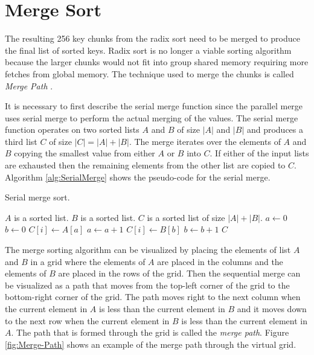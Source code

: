 \section{Merge Sort}

The resulting 256 key chunks from the radix sort need to be merged to produce the final list of sorted keys. Radix sort is no longer a viable sorting algorithm because the larger chunks would not fit into group shared memory requiring more fetches from global memory. The technique used to merge the chunks is called \emph{Merge Path} \parencite{33_green_mccoll_bader_2012}.

It is necessary to first describe the serial merge function since the parallel merge uses serial merge to perform the actual merging of the values. The serial merge function operates on two sorted lists $A$ and $B$ of size $|A|$ and $|B|$ and produces a third list $C$ of size $|C|=|A|+|B|$. The merge iterates over the elements of $A$ and $B$ copying the smallest value from either $A$ or $B$ into $C$. If either of the input lists are exhausted then the remaining elements from the other list are copied to $C$. Algorithm \ref{alg:SerialMerge} shows the pseudo-code for the serial merge.

\begin{algorithm}[H]
\caption{Serial merge sort.}
\label{alg:SerialMerge}
\begin{algorithmic}[1]
\Require $A$ is a sorted list.
\Require $B$ is a sorted list.
\Ensure $C$ is a sorted list of size $|A|+|B|$.
\State $a \gets 0$
\State $b \gets 0$
\State $C[i] \gets A[a]$
\State $a \gets a+1$
\Else
\State $C[i] \gets B[b]$
\State $b \gets b+1$
\EndIf
\EndFor
\State \Return $C$
\EndFunction
\end{algorithmic}
\end{algorithm}

The merge sorting algorithm can be visualized by placing the elements of list $A$ and $B$ in a grid where the elements of $A$ are placed in the columns and the elements of $B$ are placed in the rows of the grid. Then the sequential merge can be visualized as a path that moves from the top-left corner of the grid to the bottom-right corner of the grid. The path moves right to the next column when the current element in $A$ is less than the current element in $B$ and it moves down to the next row when the current element in $B$ is less than the current element in $A$. The path that is formed through the grid is called the \emph{merge path}. Figure \ref{fig:Merge-Path} shows an example of the merge path through the virtual grid.

